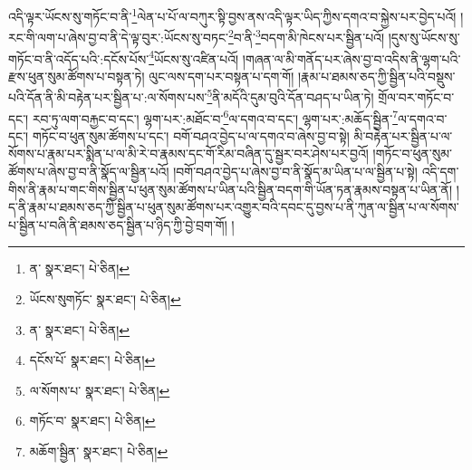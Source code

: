 འདི་ལྟར་ཡོངས་སུ་གཏོང་བ་ནི་\footnote{ན་  སྣར་ཐང་།  པེ་ཅིན། }ལེན་པ་པོ་ལ་བཀུར་སྟི་བྱས་ནས་འདི་ལྟར་ཡིད་ཀྱིས་དགའ་བ་སྐྱེས་པར་བྱེད་པའོ། །རང་གི་ལག་པ་ཞེས་བྱ་བ་ནི་དེ་ལྟ་བུར་:ཡོངས་སུ་བཏང་\footnote{ཡོངས་སུགཏོང་  སྣར་ཐང་།  པེ་ཅིན། }བ་ནི་\footnote{ན་  སྣར་ཐང་།  པེ་ཅིན། }བདག་མི་ཁེངས་པར་སྦྱིན་པའོ། །དུས་སུ་ཡོངས་སུ་གཏོང་བ་ནི་འདོད་པའི་:དངོས་པོས་\footnote{དངོས་པོ་  སྣར་ཐང་།  པེ་ཅིན། }ཡོངས་སུ་འཛིན་པའོ། །གཞན་ལ་མི་གནོད་པར་ཞེས་བྱ་བ་འདིས་ནི་ལྷག་པའི་རྫས་ཕུན་སུམ་ཚོགས་པ་བསྟན་ཏེ། ལུང་ལས་དག་པར་བསྟན་པ་དག་གོ། །རྣམ་པ་ཐམས་ཅད་ཀྱི་སྦྱིན་པའི་བསྡུས་པའི་དོན་ནི་མི་བརྟེན་པར་སྦྱིན་པ་:ལ་སོགས་པས་\footnote{ལ་སོགས་པ་  སྣར་ཐང་།  པེ་ཅིན། }ནི་མདོའི་དུམ་བུའི་དོན་བཤད་པ་ཡིན་ཏེ། གྲོལ་བར་གཏོང་བ་དང་། རབ་ཏུ་ལག་བརྐྱང་བ་དང་། ལྷག་པར་:མཐོང་བ་\footnote{གཏོང་བ་  སྣར་ཐང་།  པེ་ཅིན། }ལ་དགའ་བ་དང་། ལྷག་པར་:མཆོད་སྦྱིན་\footnote{མཆོག་སྦྱིན་  སྣར་ཐང་།  པེ་ཅིན། }ལ་དགའ་བ་དང་། གཏོང་བ་ཕུན་སུམ་ཚོགས་པ་དང་། བགོ་བཤའ་བྱེད་པ་ལ་དགའ་བ་ཞེས་བྱ་བ་སྟེ། མི་བརྟེན་པར་སྦྱིན་པ་ལ་སོགས་པ་རྣམ་པར་སྨིན་པ་ལ་མི་རེ་བ་རྣམས་དང་གོ་རིམ་བཞིན་དུ་སྦྱར་བར་ཤེས་པར་བྱའོ། །གཏོང་བ་ཕུན་སུམ་ཚོགས་པ་ཞེས་བྱ་བ་ནི་སྣོད་ལ་སྦྱིན་པའོ། །བགོ་བཤའ་བྱེད་པ་ཞེས་བྱ་བ་ནི་སྣོད་མ་ཡིན་པ་ལ་སྦྱིན་པ་སྟེ། འདི་དག་གིས་ནི་རྣམ་པ་གང་གིས་སྦྱིན་པ་ཕུན་སུམ་ཚོགས་པ་ཡིན་པའི་སྦྱིན་བདག་གི་ཡོན་ཏན་རྣམས་བསྟན་པ་ཡིན་ནོ། །ད་ནི་རྣམ་པ་ཐམས་ཅད་ཀྱི་སྦྱིན་པ་ཕུན་སུམ་ཚོགས་པར་འགྱུར་བའི་དབང་དུ་བྱས་པ་ནི་ཀུན་ལ་སྦྱིན་པ་ལ་སོགས་པ་སྦྱིན་པ་བཞི་ནི་ཐམས་ཅད་སྦྱིན་པ་ཉིད་ཀྱི་བྱེ་བྲག་གོ། །
